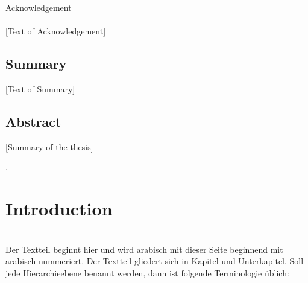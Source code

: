\documentclass[oneside,bibliography=totocnumbered,BCOR=5mm]{scrbook}%
\theoremstyle{definition}
\theoremstyle{definition}
\theoremstyle{definition}
\theoremstyle{definition}
\theoremstyle{definition}
\theoremstyle{definition}
\begin{document}
\thispagestyle{empty}       %
\vspace*{2.2cm}
\noindent %
{\Huge Acknowledgement}\\
\vspace*{1.6cm} \\

[Text of Acknowledgement]

\newpage   
\thispagestyle{empty}    %
\section*{Summary}
[Text of Summary]

\section*{Abstract}
[Summary of the thesis]


\clearpage

\tableofcontents  



 \listoffigures
 

 \listoftables
 


 \lstlistoflistings

.


\newpage

 
 \chapter{Introduction}
\\
\linebreak[4]
\linebreak[4]
Der Textteil beginnt hier und wird arabisch mit dieser Seite beginnend mit \flqq{} arabisch nummeriert. Der Textteil gliedert sich in Kapitel und Unterkapitel. Soll jede Hierarchieebene benannt werden, dann ist folgende Terminologie  \"ublich:
\end{document}
